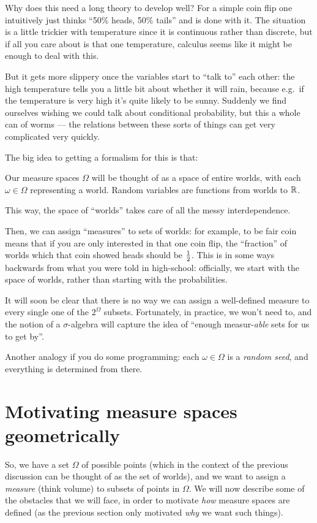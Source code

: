 Why does this need a long theory to develop well?
For a simple coin flip one intuitively just thinks
``50\% heads, 50\% tails'' and is done with it.
The situation is a little trickier with temperature
since it is continuous rather than discrete,
but if all you care about is that one temperature,
calculus seems like it might be enough to deal with this.

But it gets more slippery once the variables start to ``talk to'' each other:
the high temperature tells you a little bit about whether it will rain,
because e.g.\ if the temperature is very high it's quite likely to be sunny.
Suddenly we find ourselves wishing we could talk about conditional probability,
but this a whole can of worms --- the relations
between these sorts of things can get very complicated very quickly.

The big idea to getting a formalism for this is that:
\begin{moral}
	Our measure spaces $\Omega$ will be thought of as a space of entire worlds,
	with each $\omega \in \Omega$ representing a world.
	Random variables are functions from worlds to $\mathbb R$.
\end{moral}
This way, the space of ``worlds'' takes care of all the messy interdependence.

Then, we can assign ``measures'' to sets of worlds:
for example, to be fair coin means that if you are only interested in
that one coin flip, the ``fraction'' of worlds
which that coin showed heads should be $\frac{1}{2}$.
This is in some ways backwards from what you were told in high-school:
officially, we start with the space of worlds,
rather than starting with the probabilities.

It will soon be clear that there is no way we can assign
a well-defined measure to every single one of the $2^\Omega$ subsets.
Fortunately, in practice, we won't need to,
and the notion of a $\sigma$-algebra will capture the idea
of ``enough measur-\emph{able} sets for us to get by''.

\begin{remark}
	Another analogy if you do some programming:
	each $\omega \in \Omega$ is a \emph{random seed},
	and everything is determined from there.
\end{remark}

\section{Motivating measure spaces geometrically}
So, we have a set $\Omega$ of possible points
(which in the context of the previous discussion
can be thought of as the set of worlds),
and we want to assign a \emph{measure} (think volume)
to subsets of points in $\Omega$.
We will now describe some of the obstacles that we will face,
in order to motivate \emph{how} measure spaces are defined
(as the previous section only motivated \emph{why} we want such things).

